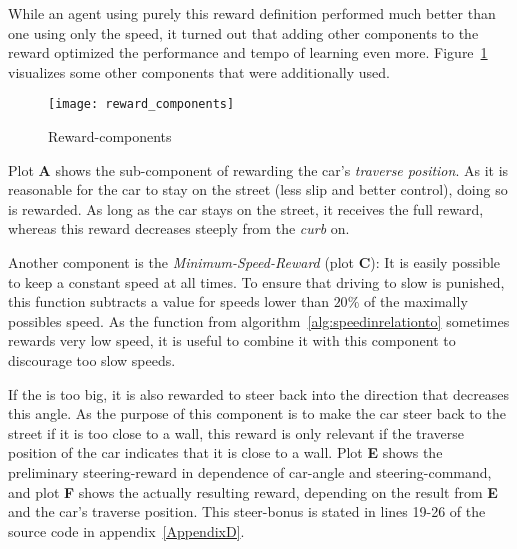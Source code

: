 While an agent using purely this reward definition performed much better than one using only the speed, it turned out that adding other components to the reward optimized the performance and tempo of learning even more. Figure~\ref{fig:reward} visualizes some other components that were additionally used. 

\begin{figure}[h]
	\centering 
	\begin{annotatedFigure}
		{\texttt{[image: reward\_components]}}
	\end{annotatedFigure}
	\caption{Reward-components}
	\label{fig:reward}
\end{figure}

Plot \textbf{A} shows the sub-component of rewarding the car's \textit{traverse position}. As it is reasonable for the car to stay on the street (less slip and better control), doing so is rewarded. As long as the car stays on the street, it receives the full reward, whereas this reward decreases steeply from the \textit{curb} on.

Another component is the \textit{Minimum-Speed-Reward} (plot \textbf{C}): It is easily possible to keep a constant speed at all times. To ensure that driving to slow is punished, this function subtracts a value for speeds lower than $20\%$ of the maximally possibles speed. As the function from algorithm~\ref{alg:speedinrelationto} sometimes rewards very low speed, it is useful to combine it with this component to discourage too slow speeds.

If the  is too big, it is also rewarded to steer back into the direction that decreases this angle. As the purpose of this component is to make the car steer back to the street if it is too close to a wall, this reward is only relevant if the traverse position of the car indicates that it is close to a wall. Plot \textbf{E} shows the preliminary steering-reward in dependence of car-angle and steering-command, and plot \textbf{F} shows the actually resulting reward, depending on the result from \textbf{E} and the car's traverse position. This steer-bonus is stated in lines 19-26 of the source code in appendix~\ref{AppendixD}. 

